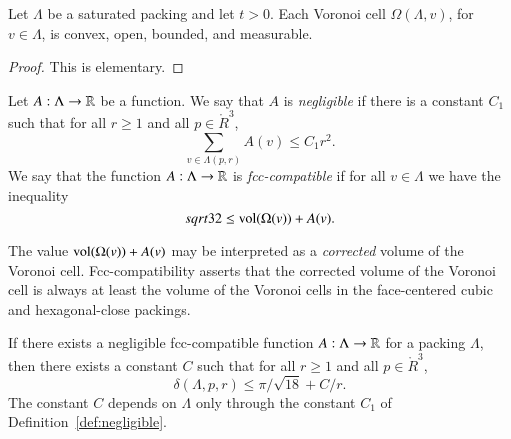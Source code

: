 \begin{lemma} Let $\Lambda$ be a saturated packing and let $t>0$.
Each Voronoi cell $\Omega(\Lambda,v)$, for $v\in\Lambda$, is
convex, open, bounded, and measurable.
\end{lemma}

\begin{proof}  This is elementary.
\end{proof}

\begin{definition}[negligible]\label{def:negligible}
Let $A:\Lambda\to{\mathbb R}$ be a function.  We say that $A$
is
  {\it negligible\/}
if there is a constant $C_1$ such that for all $r\ge1$ and all
$p\in\ring{R}^3$,
   $$\sum_{v\in\Lambda(p,r)} A(v) \le C_1 r^2.$$
We say that the function $A:\Lambda\to{\mathbb R}$ is
  {\it fcc-compatible\/}
if for all $v\in\Lambda$ we have the inequality
$$sqrt{32}\le {\operatorname{vol}}(\Omega(v)) + A(v).$$
\end{definition}





\begin{remark}
The value ${\operatorname{vol}}(\Omega(v)) + A(v)$ may be interpreted as a
{\it corrected\/} volume of the Voronoi
cell. Fcc-compatibility asserts that the corrected volume of the
Voronoi cell is always at least the volume of the Voronoi cells in
the face-centered cubic and hexagonal-close packings.
\end{remark}



\begin{lemma}
\label{lemma:deltabound} If there exists a 
negligible  fcc-compatible function
$A:\Lambda\to{\mathbb R}$ for a 
packing $\Lambda$, then there
exists a constant $C$ such that for all $r\ge1$ and all
$p\in\ring{R}^3$,
    $$
    \delta(\Lambda,p,r)
    \le \pi/\sqrt{18} + C/r.
    $$
The constant $C$ depends on $\Lambda$ only through the constant
$C_1$ of Definition~\ref{def:negligible}.
\end{lemma}




